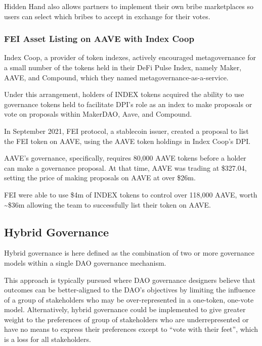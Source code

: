 \documentclass[
]{article}
\begin{document}
Hidden Hand also allows partners to implement their own bribe
marketplaces so users can select which bribes to accept in exchange for
their votes.

\hypertarget{fei-asset-listing-on-aave-with-index-coop}{%
\subsubsection{FEI Asset Listing on AAVE with Index
Coop}\label{fei-asset-listing-on-aave-with-index-coop}}

Index Coop, a provider of token indexes, actively encouraged
metagovernance for a small number of the tokens held in their DeFi Pulse
Index, namely Maker, AAVE, and Compound, which they named
metagovernance-as-a-service.

Under this arrangement, holders of INDEX tokens acquired the ability to
use governance tokens held to facilitate DPI's role as an index to make
proposals or vote on proposals within MakerDAO, Aave, and Compound.

In September 2021, FEI protocol, a stablecoin issuer, created a proposal
to list the FEI token on AAVE, using the AAVE token holdings in Index
Coop's DPI.

AAVE's governance, specifically, requires 80,000 AAVE tokens before a
holder can make a governance proposal. At that time, AAVE was trading at
\$327.04, setting the price of making proposals on AAVE at over \$26m.

FEI were able to use \$4m of INDEX tokens to control over 118,000 AAVE,
worth \textasciitilde\$36m allowing the team to successfully list their
token on AAVE.

\hypertarget{hybrid-governance}{%
\subsection{Hybrid Governance}\label{hybrid-governance}}

Hybrid governance is here defined as the combination of two or more
governance models within a single DAO governance mechanism.

This approach is typically pursued where DAO governance designers
believe that outcomes can be better-aligned to the DAO's objectives by
limiting the influence of a group of stakeholders who may be
over-represented in a one-token, one-vote model. Alternatively, hybrid
governance could be implemented to give greater weight to the
preferences of group of stakeholders who are underrepresented or have no
means to express their preferences except to ``vote with their feet'',
which is a loss for all stakeholders.
\end{document}
